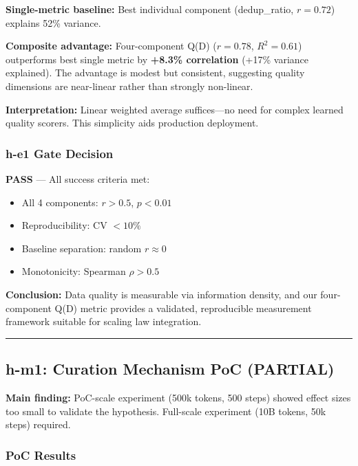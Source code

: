 \textbf{Single-metric baseline:} Best individual component (dedup\_ratio, $r = 0.72$) explains 52\% variance.

\textbf{Composite advantage:} Four-component Q(D) ($r = 0.78$, $R^2 = 0.61$) outperforms best single metric by \textbf{+8.3\% correlation} (+17\% variance explained). The advantage is modest but consistent, suggesting quality dimensions are near-linear rather than strongly non-linear.

\textbf{Interpretation:} Linear weighted average suffices---no need for complex learned quality scorers. This simplicity aids production deployment.

\subsubsection{h-e1 Gate Decision}

\textbf{\checkmark{} PASS} --- All success criteria met:
\begin{itemize}
\item All 4 components: $r > 0.5$, $p < 0.01$ \checkmark{}
\item Reproducibility: CV $< 10\%$ \checkmark{}
\item Baseline separation: random $r \approx 0$ \checkmark{}
\item Monotonicity: Spearman $\rho > 0.5$ \checkmark{}
\end{itemize}

\textbf{Conclusion:} Data quality is measurable via information density, and our four-component Q(D) metric provides a validated, reproducible measurement framework suitable for scaling law integration.

\vspace{0.5em}
\noindent\rule{\textwidth}{0.4pt}
\vspace{0.5em}

\subsection{h-m1: Curation Mechanism PoC (PARTIAL)}

\textbf{Main finding:} PoC-scale experiment (500k tokens, 500 steps) showed effect sizes too small to validate the hypothesis. Full-scale experiment (10B tokens, 50k steps) required.

\subsubsection{PoC Results}

